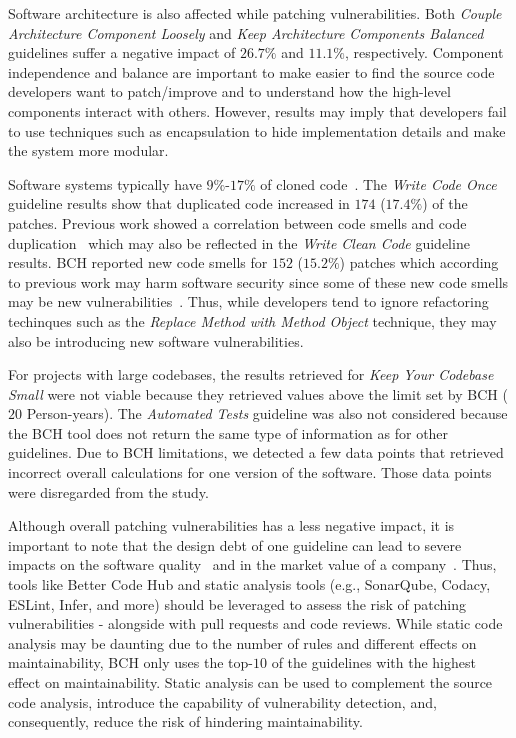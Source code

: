 \documentclass[10pt,conference]{IEEEtran}
\begin{document}
Software architecture is also affected while patching vulnerabilities.
Both \emph{Couple Architecture Component Loosely} and \emph{Keep
Architecture Components Balanced} guidelines suffer a negative impact of 
$26.7\%$ and $11.1\%$, respectively. Component independence and balance
are important to make easier to find the source code developers
want to patch/improve and to understand how the high-level components
interact with others. However, results may imply that developers
fail to use techniques such as encapsulation to hide implementation
details and make the system more modular.

Software systems typically have $9\%$-$17\%$ of cloned code~\cite{5773403}. 
The \emph{Write Code Once} guideline results show that duplicated code 
increased in $174$ ($17.4\%$) of the patches. Previous work showed a 
correlation between code smells and code duplication~\cite{7476787} 
which may also be reflected in the \emph{Write Clean Code} guideline results. 
BCH reported new code smells for $152$ ($15.2\%$) patches which according 
to previous work may harm software security since some of these new code
smells may be new vulnerabilities~\cite{8819456}. Thus, while developers 
tend to ignore refactoring techinques such as the \emph{Replace Method 
with Method Object} technique, they may also be introducing new software 
vulnerabilities. 
  
For projects with large codebases, the results retrieved for \emph{Keep Your 
Codebase Small} were not viable because they retrieved values above the limit 
set by BCH ($20$ Person-years). The \emph{Automated Tests} guideline was also 
not considered because the BCH tool does not return the same type of information
as for other guidelines. Due to BCH limitations, we detected a few data points
that retrieved incorrect overall calculations for one version of the software. 
Those data points were disregarded from the study.

Although overall patching vulnerabilities has a less negative impact, it is 
important to note that the design debt of one guideline can lead
to severe impacts on the software quality~\cite{10.1145/1985362.1985366} 
and in the market value of a company~\cite{4267025}. Thus,
tools like Better Code Hub and static analysis tools (e.g., SonarQube, Codacy,
ESLint, Infer, and more) should be leveraged to 
assess the risk of patching vulnerabilities - alongside with pull
requests and code reviews. While static code analysis
may be daunting due to the number of rules and different effects
on maintainability, BCH only uses the top-$10$ of the guidelines
with the highest effect on maintainability. Static analysis 
can be used to complement the source code analysis, introduce
the capability of vulnerability detection, and, consequently,
reduce the risk of hindering maintainability. 
\end{document}
